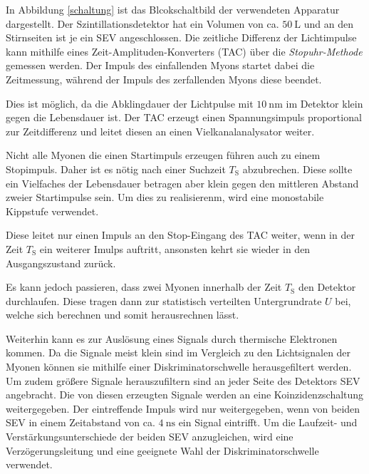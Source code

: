 In Abbildung \ref{schaltung} ist das Blcokschaltbild der verwendeten Apparatur dargestellt.
Der Szintillationsdetektor hat ein Volumen von ca. $\SI{50}{\liter}$ und an den Stirnseiten ist je ein SEV angeschlossen.
Die zeitliche Differenz der Lichtimpulse kann mithilfe eines Zeit-Amplituden-Konverters (TAC) über die \textit{Stopuhr-Methode} gemessen werden.
Der Impuls des einfallenden Myons startet dabei die Zeitmessung, während der Impuls des zerfallenden Myons diese beendet.

Dies ist möglich, da die Abklingdauer der Lichtpulse mit $\SI{10}{\nano\meter}$ im Detektor klein gegen die Lebensdauer ist.
Der TAC erzeugt einen Spannungsimpuls proportional zur Zeitdifferenz und leitet diesen an einen Vielkanalanalysator weiter.

Nicht alle Myonen die einen Startimpuls erzeugen führen auch zu einem Stopimpuls.
Daher ist es nötig nach einer Suchzeit $T_\text{S}$ abzubrechen.
Diese sollte ein Vielfaches der Lebensdauer betragen aber klein gegen den mittleren Abstand zweier Startimpulse sein.
Um dies zu realisierenm, wird eine monostabile Kippstufe verwendet.

Diese leitet nur einen Impuls an den Stop-Eingang des TAC weiter, wenn in der Zeit $T_\text{S}$ ein weiterer Imulps auftritt, ansonsten kehrt sie wieder in den Ausgangszustand zurück.

Es kann jedoch passieren, dass zwei Myonen innerhalb der Zeit $T_\text{S}$ den Detektor durchlaufen.
Diese tragen dann zur statistisch verteilten Untergrundrate $U$ bei, welche sich berechnen und somit herausrechnen lässt.

Weiterhin kann es zur Auslösung eines Signals durch thermische Elektronen kommen.
Da die Signale meist klein sind im Vergleich zu den Lichtsignalen der Myonen können sie mithilfe einer Diskriminatorschwelle herausgefiltert werden.
Um zudem größere Signale herauszufiltern sind an jeder Seite des Detektors SEV angebracht.
Die von diesen erzeugten Signale werden an eine Koinzidenzschaltung weitergegeben.
Der eintreffende Impuls wird nur weitergegeben, wenn von beiden SEV in einem Zeitabstand von ca. $\SI{4}{\nano\second}$ ein Signal eintrifft.
Um die Laufzeit- und Verstärkungsunterschiede der beiden SEV anzugleichen, wird eine Verzögerungsleitung und eine geeignete Wahl der Diskriminatorschwelle verwendet.
\FloatBarrier

